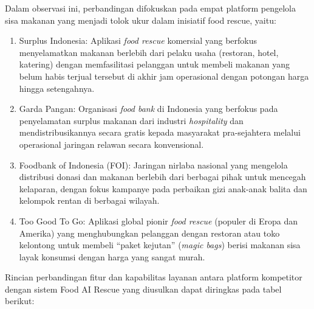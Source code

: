 \par Dalam observasi ini, perbandingan difokuskan pada empat platform pengelola sisa makanan yang menjadi tolok ukur dalam inisiatif food rescue, yaitu:
\begin{enumerate}
    \item Surplus Indonesia: Aplikasi \textit{food rescue} komersial yang berfokus menyelamatkan makanan berlebih dari pelaku usaha (restoran, hotel, katering) dengan memfasilitasi pelanggan untuk membeli makanan yang belum habis terjual tersebut di akhir jam operasional dengan potongan harga hingga setengahnya.
    \item Garda Pangan: Organisasi \textit{food bank} di Indonesia yang berfokus pada penyelamatan surplus makanan dari industri \textit{hospitality} dan mendistribusikannya secara gratis kepada masyarakat pra-sejahtera melalui operasional jaringan relawan secara konvensional.
    \item Foodbank of Indonesia (FOI): Jaringan nirlaba nasional yang mengelola distribusi donasi dan makanan berlebih dari berbagai pihak untuk mencegah kelaparan, dengan fokus kampanye pada perbaikan gizi anak-anak balita dan kelompok rentan di berbagai wilayah.
    \item Too Good To Go: Aplikasi global pionir \textit{food rescue} (populer di Eropa dan Amerika) yang menghubungkan pelanggan dengan restoran atau toko kelontong untuk membeli ``paket kejutan'' (\textit{magic bags}) berisi makanan sisa layak konsumsi dengan harga yang sangat murah.
\end{enumerate}

\par Rincian perbandingan fitur dan kapabilitas layanan antara platform kompetitor dengan sistem Food AI Rescue yang diusulkan dapat diringkas pada tabel berikut:

